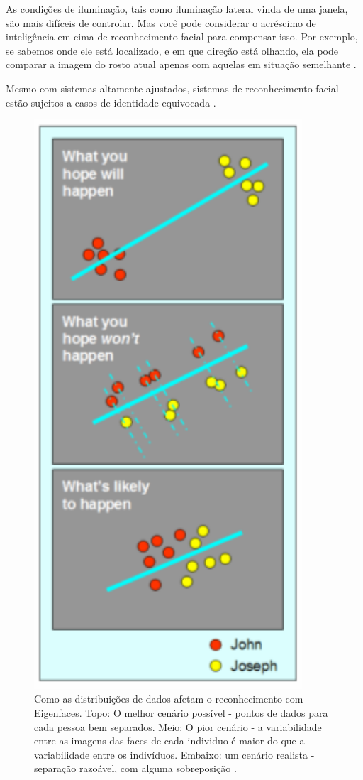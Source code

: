 As condições de iluminação, tais como iluminação lateral vinda de uma janela, são mais difíceis de controlar. Mas você pode considerar o acréscimo de inteligência em cima de reconhecimento facial para compensar isso. Por exemplo, se sabemos onde ele está localizado, e em que direção está olhando, ela pode comparar a imagem do rosto atual apenas com aquelas em situação semelhante \cite{hewitt}.

Mesmo com sistemas altamente ajustados, sistemas de reconhecimento facial estão sujeitos a casos de identidade equivocada \cite{hewitt}.

	\begin{figure}[hbt]
		\begin{center}
			\includegraphics[width=10cm]{figuras/2.FundamentacaoTeorica/espacoPCA.png}
		\end{center}
		\caption{Como as distribuições de dados afetam o reconhecimento com Eigenfaces. Topo: O melhor cenário possível - pontos de dados para cada pessoa bem separados. Meio: O pior cenário - a variabilidade entre as imagens das faces de cada individuo é maior do que a variabilidade entre os indivíduos. Embaixo: um cenário realista - separação razoável, com alguma sobreposição \cite{hewitt}.}
		\label{exemploEspacoPCA}
	\end{figure}


